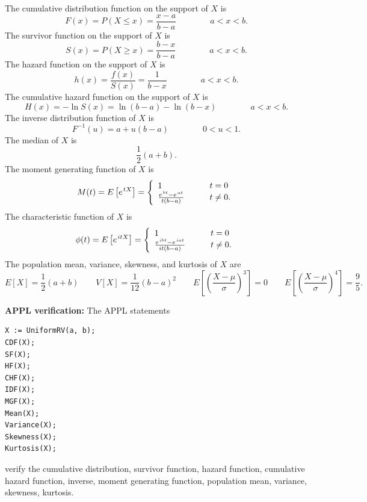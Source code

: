 \documentclass[12pt,fullpage]{article}
\begin{document}
\noindent
The cumulative distribution function on
the support of $X$ is
$$
F(x) = P(X \le x) = \frac{x-a}{b-a} \qquad \qquad a < x < b.
$$
The survivor function on the support of $X$ is
$$
S(x) = P(X \ge x) = \frac{b-x}{b-a} \qquad \qquad a < x < b.
$$
The hazard function on the support of $X$ is
$$
h(x) = \frac{f(x)}{S(x)} = \frac{1}{b-x} \qquad \qquad a < x < b.
$$
The cumulative hazard function on the support of $X$ is
$$
H(x) = - \ln S(x) = \ln(b-a) -\ln(b-x) \qquad \qquad a < x < b.
$$
The inverse distribution function of $X$ is
$$
F ^ {-1}(u) = a + u(b-a) \qquad \qquad 0 < u < 1.
$$
The median of $X$ is
$$
\frac{1}{2}(a+b).
$$
The moment generating function of $X$ is
$$
M(t) = E\left[ e ^ {\kern 0.08 em tX} \right] = \left\{ \begin{array}{ll}
       1 & \qquad t = 0 \\
       \frac{e^{\kern 0.08 em bt}-e^{\kern 0.08 em  at}}{t(b-a)} & \qquad t \ne 0.
       \end{array} \right. 
$$
The characteristic function of $X$ is
$$
\phi(t) = E\left[ e ^ {\kern 0.08 em itX} \right] = \left\{ \begin{array}{ll}
          1 & \qquad t = 0 \\
          \frac{e^{\kern 0.08 em ibt}-e^{\kern 0.08 em iat}}{it(b-a)} & \qquad t \ne 0.
          \end{array} \right. 
$$
The population mean, variance, skewness, and kurtosis of $X$ are
$$
E[X] = \frac{1}{2}(a+b) \qquad 
V[X] = \frac{1}{12}(b-a)^{2} \qquad 
E\left[ \left( \frac{X - \mu}{\sigma} \right) ^ 3 \right] = 0 \qquad 
E\left[ \left( \frac{X - \mu}{\sigma} \right) ^ 4 \right] = \frac{9}{5}.
$$

\vspace{0.1in}

\noindent
{\bf APPL verification:}
The APPL statements
\begin{verbatim}
X := UniformRV(a, b);
CDF(X);
SF(X);
HF(X);
CHF(X);
IDF(X);
MGF(X);
Mean(X);
Variance(X);
Skewness(X);
Kurtosis(X);
\end{verbatim}
verify the cumulative distribution, survivor function, hazard function, cumulative hazard function, inverse, moment generating function, population mean, variance, skewness, kurtosis.
\end{document}
